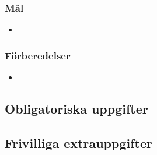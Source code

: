 
\Lab{\LabWeekONE}

\subsubsection{Mål}
\begin{itemize}[nosep]
\item 
\end{itemize}

\subsubsection{Förberedelser}
\begin{itemize}[nosep]
\item 
\end{itemize}

\subsection{Obligatoriska uppgifter}


\Task 

\subsection{Frivilliga extrauppgifter}

\Task 
